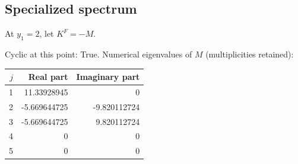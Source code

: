 \documentclass[10pt,a4paper]{article}
\newcommand{\fitmath}[1]{\sbox{\mathbox}{$\displaystyle #1$}\ifdim\wd\mathbox>\linewidth\resizebox{\linewidth}{!}{\usebox{\mathbox}}\else\usebox{\mathbox}\fi}
\begin{document}
\subsection*{Specialized spectrum}
At $y_1=2$, let $K^F=-M$.
\begin{center}\fitmath{\Delta=59049}\end{center}
Cyclic at this point: True.
Numerical eigenvalues of $M$ (multiplicities retained):
\begin{center}\small\begin{tabular}{rrr}\toprule $j$ & Real part & Imaginary part\\\midrule
1 & 11.33928945 & 0\\
2 & -5.669644725 & -9.820112724\\
3 & -5.669644725 & 9.820112724\\
4 & 0 & 0\\
5 & 0 & 0\\
\bottomrule\end{tabular}\end{center}
\end{document}

